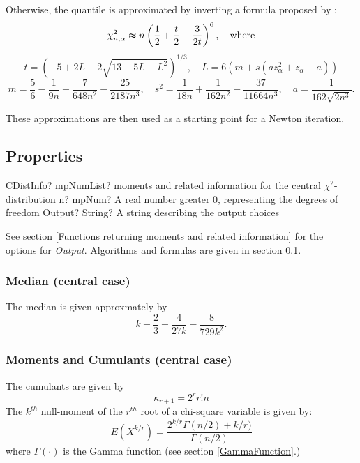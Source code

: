 \vpara
Otherwise, the quantile is approximated by inverting a formula proposed by \cite{canal_2005}:
\begin{equation}
\chi^2_{n,\alpha}  \thickapprox  n\left( \frac{1}{2}+  \frac{t}{2}- \frac{3}{2t}\right)^6, \quad \text{where}
\end{equation}
\begin{equation*}
t = \left({-5+2L + 2 \sqrt{13-5L+L^2}} \right)^{1/3} , \quad L = 6 \left(m + s \left(az^2_{\alpha} + z_{\alpha} - a \right) \right)
\end{equation*}
\begin{equation*}
m =  \frac{5}{6} -  \frac{1}{9n}  - \frac{7}{648n^2} - \frac{25}{2187n^3}, \quad s^2 =  \frac{1}{18n}  + \frac{1}{162n^2} - \frac{37}{11664n^3}, \quad a = \frac{1}{162 \sqrt{2n^3}}.
\end{equation*}

These approximations are then used as a starting point for a Newton iteration.





\subsection{Properties}
\label{ChiSquareDistributionProperties}

\begin{mpFunctionsExtract}
	\mpFunctionTwoNotImplemented
	{CDistInfo? mpNumList? moments and related information for the central $\chi^2$-distribution}
	{n? mpNum? A real number greater 0, representing the degrees of freedom}
	{Output? String? A string describing the output choices}
\end{mpFunctionsExtract}

\vspace{0.3cm}

See section \ref{Functions returning moments and related information} for the options for {\itshape\sffamily Output}. Algorithms and formulas are given in section \ref{ChiSquareDistributionProperties}.


\subsubsection{Median (central case)}
The median is given approxmately by 
\begin{equation}
k- \frac{2}{3} +  \frac{4}{27k}  - \frac{8}{729k^2}.
\end{equation}

\subsubsection{Moments and Cumulants (central case)}
The cumulants are given by
\begin{equation}
\kappa_{r+1} = 2^r r! n
\end{equation}
The $k^{th}$ null-moment of the $r^{th}$ root of a chi-square variable is given by:
\begin{equation}
E(X^{k/r})  = \frac{2^{k/r}\Gamma(n/2)+k/r)}{\Gamma(n/2)}
\end{equation}
where $\Gamma(\cdot)$ is the Gamma function (see section \ref{GammaFunction}.)

